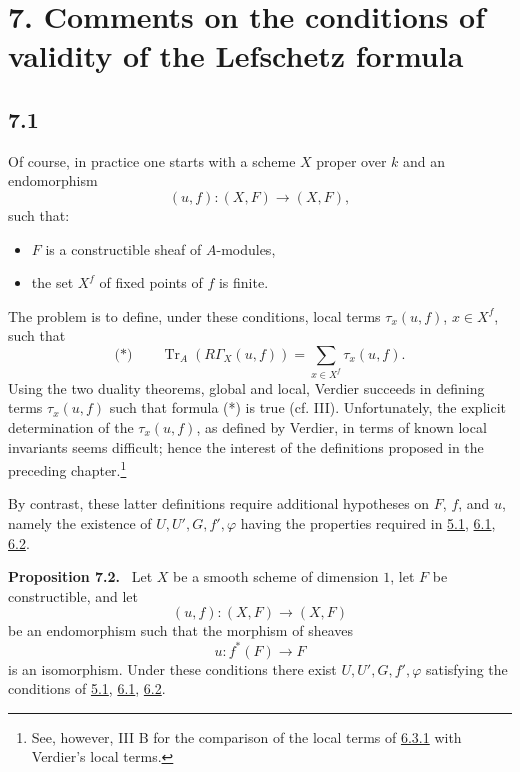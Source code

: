 \documentclass[11pt]{article}
\newenvironment{statement}[1]{\par\medskip\noindent\textbf{#1.}\ }{\par\medskip}
\providecommand{\Tr}{\operatorname{Tr}}
\providecommand{\Tr}{\operatorname{Tr}}
\providecommand{\Tr}{\operatorname{Tr}}
\providecommand{\Tr}{\operatorname{Tr}}
\providecommand{\Tr}{\operatorname{Tr}}
\begin{document}
\section*{7. Comments on the conditions of validity of the Lefschetz formula}\label{sga5:XII:section:7}

\subsection*{7.1}\label{sga5:XII:subsection:7.1}
Of course, in practice one starts with a scheme $X$ proper over $k$ and an endomorphism
\[
(u,f):(X,F)\longrightarrow (X,F),
\]
such that:
\begin{itemize}
\item $F$ is a constructible sheaf of $A$-modules,
\item the set $X^f$ of fixed points of $f$ is finite.
\end{itemize}
The problem is to define, under these conditions, local terms $\tau_x(u,f)$, $x\in X^f$, such that
\[
\text{(*)}\qquad \Tr_A(R\Gamma_X(u,f))=\sum_{x\in X^f}\tau_x(u,f).
\]
Using the two duality theorems, global and local, Verdier succeeds in defining terms $\tau_x(u,f)$ such that formula (*) is true (cf. III). Unfortunately, the explicit determination of the $\tau_x(u,f)$, as defined by Verdier, in terms of known local invariants seems difficult; hence the interest of the definitions proposed in the preceding chapter.\footnote{See, however, III B for the comparison of the local terms of \hyperref[sga5:XII:equation:6.3.1]{6.3.1} with Verdier's local terms.}

By contrast, these latter definitions require additional hypotheses on $F$, $f$, and $u$, namely the existence of $U,U',G,f',\varphi$ having the properties required in \hyperref[sga5:XII:proposition:5.1]{5.1}, \hyperref[sga5:XII:subsection:6.1]{6.1}, \hyperref[sga5:XII:subsection:6.2]{6.2}.

\label{sga5:XII:proposition:7.2}\begin{statement}{Proposition 7.2}
Let $X$ be a smooth scheme of dimension $1$, let $F$ be constructible, and let
\[
(u,f):(X,F)\longrightarrow (X,F)
\]
be an endomorphism such that the morphism of sheaves
\[
u:f^*(F)\longrightarrow F
\]
is an isomorphism. Under these conditions there exist $U,U',G,f',\varphi$ satisfying the conditions of \hyperref[sga5:XII:proposition:5.1]{5.1}, \hyperref[sga5:XII:subsection:6.1]{6.1}, \hyperref[sga5:XII:subsection:6.2]{6.2}.
\end{statement}
\end{document}
